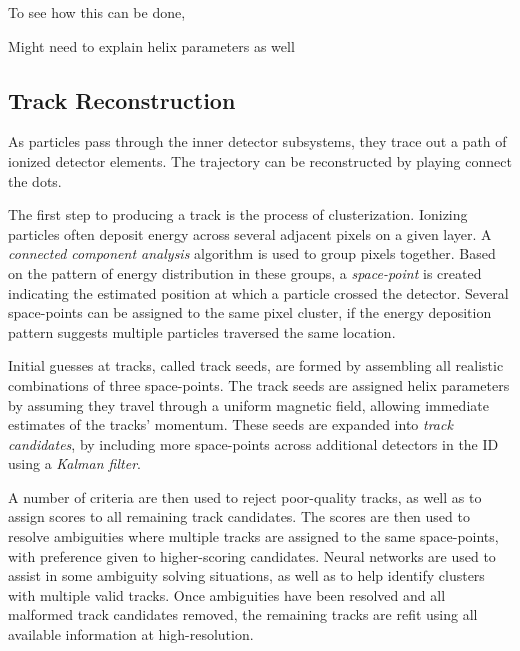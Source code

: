             To see how this can be done, 

            



            Might need to explain helix parameters as well
            \cite{thesis_track_sim_and_reco}
            \cite{charged_particle_tracking}

        \subsection{Track Reconstruction}

            As particles pass through the inner detector subsystems, they trace out a path of ionized detector elements.
            The trajectory can be reconstructed by playing connect the dots.

            The first step to producing a track is the process of clusterization.
            Ionizing particles often deposit energy across several adjacent pixels on a given layer.
            A \textit{connected component analysis} algorithm is used to group pixels together. 
            Based on the pattern of energy distribution in these groups,
                a \textit{space-point} is created indicating the estimated position at which a particle crossed the detector.
            Several space-points can be assigned to the same pixel cluster,
                if the energy deposition pattern suggests multiple particles traversed the same location.

            Initial guesses at tracks, called track seeds, are formed by assembling all realistic combinations of three space-points.
            The track seeds are assigned helix parameters by assuming they travel through a uniform magnetic field,
                allowing immediate estimates of the tracks' momentum.
            These seeds are expanded into \textit{track candidates},
                by including more space-points across additional detectors in the ID using a \textit{Kalman filter}.

            A number of criteria are then used to reject poor-quality tracks, as well as to assign scores to all remaining track candidates.
            The scores are then used to resolve ambiguities where multiple tracks are assigned to the same space-points,
                with preference given to higher-scoring candidates.
            Neural networks are used to assist in some ambiguity solving situations,
                as well as to help identify clusters with multiple valid tracks.
            Once ambiguities have been resolved and all malformed track candidates removed,
                the remaining tracks are refit using all available information at high-resolution.
            \cite{atlas_track_reco_performance}

